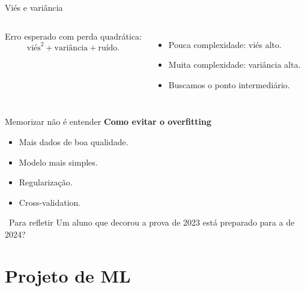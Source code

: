 \documentclass[10pt]{beamer}
\newenvironment{reflexao}{\begin{exampleblock}{\faQuestionCircle\ Para refletir}}{\end{exampleblock}}
\begin{document}
\begin{frame}{Viés e variância}
\begin{columns}[c]
\small
Erro esperado com perda quadrática:
\[ \text{viés}^2+\text{variância}+\text{ruído}. \]
\begin{itemize}
 \item Pouca complexidade: viés alto.
 \item Muita complexidade: variância alta.
 \item Buscamos o ponto intermediário.
\end{itemize}
\end{columns}
\end{frame}

\begin{frame}{Memorizar não é entender}
\textbf{Como evitar o overfitting}
\begin{itemize}
 \item Mais dados de boa qualidade.
 \item Modelo mais simples.
 \item Regularização.
 \item Cross-validation.
\end{itemize}
\begin{reflexao}
Um aluno que decorou a prova de 2023 está preparado para a de 2024?
\end{reflexao}
\end{frame}

\section{Projeto de ML}
\end{document}
